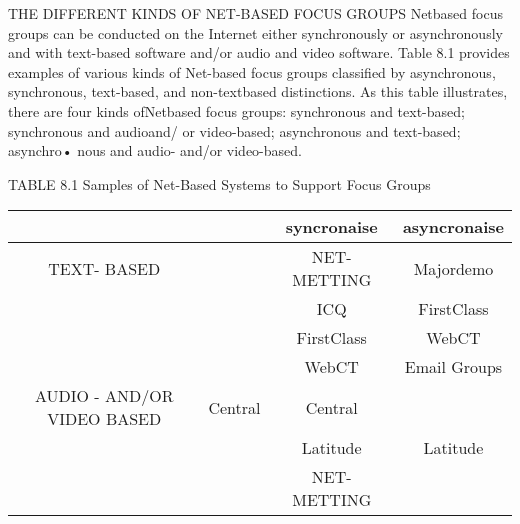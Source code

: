 \documentclass{beamer}
\begin{document}
\begin{frame}{THE DIFFERENT KINDS OF NET-BASED FOCUS GROUPS}
Netbased focus groups can be conducted on the Internet either synchronously
or asynchronously and with text-based software and/or audio and video
software. Table 8.1 provides examples of various kinds of Net-based focus
groups classified by asynchronous, synchronous, text-based, and non-textbased
distinctions. As this table illustrates, there are four kinds ofNetbased
focus groups: synchronous and text-based; synchronous and audioand/
or video-based; asynchronous and text-based; asynchro• nous and
audio- and/or video-based.

TABLE 8.1 Samples of Net-Based Systems to Support Focus  Groups\\
\begin{tabular}{cccc}\hline
	&                             &syncronaise      & asyncronaise\\\hline
	TEXT- BASED &                             & NET- METTING & Majordemo    \\\hline 
	&                             &     ICQ              & FirstClass       \\\hline
	&                             & FirstClass         & WebCT            \\\hline
	&                             &   WebCT           & Email Groups    \\\hline 
	AUDIO - AND/OR VIDEO BASED   &   Central           & Central             \\\hline
	&                             &   Latitude          &   Latitude            \\\hline
	&                             &  NET-METTING  &                            \\\hline
	
	
	
\end{tabular}

\vspace{0.1cm}
\vspace{0.1cm}
\vspace{0.1cm}

\end{frame}
\end{document}

